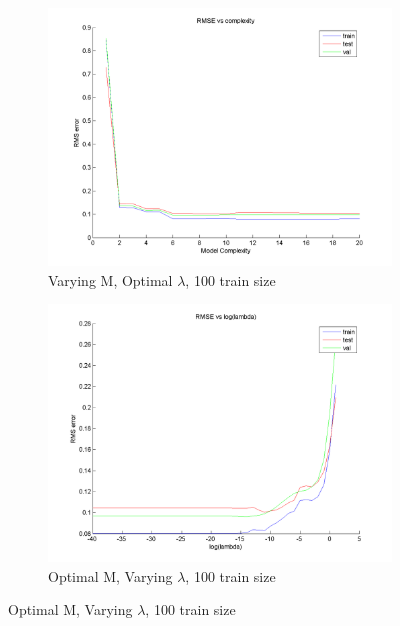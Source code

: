 \documentclass{article}
\begin{document}
\begin{figure}[H]
\begin{subfigure}{.5\textwidth}
\centering
\includegraphics[width=\linewidth]{RMS_complexity_100}
\caption{Varying M, Optimal $\lambda$, 100 train size}
\end{subfigure}
\begin{subfigure}{.5\textwidth}
\includegraphics[width=\linewidth]{RMS_lambda_100}
\caption{Optimal M, Varying $\lambda$, 100 train size}
\end{subfigure}
\end{figure}
\end{document}
